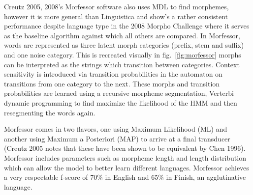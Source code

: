 \documentclass[runningheads,a4paper]{llncs}
\begin{document}
Creutz 2005, 2008's Morfessor software also uses MDL to find morphemes, however it is more general than Linguistica and show's a rather consistent performance despite language type in the 2008 Morpho Challenge where it serves as the baseline algorithm against which all others are compared. In Morfessor, words are represented as three latent morph categories (prefix, stem and suffix) and one noise category. This is recreated visually in fig.~\ref{fig:morfessor} morphs can be interpreted as the strings which transition between categories. Context sensitivity is introduced via transition probabilities in the automaton on transitions from one category to the next. These morphs and transition probabilities are learned using a recursive morpheme segmentation, Verterbi dynamic programming to find maximize the likelihood of the HMM and then resegmenting the words again. 

Morfessor comes in two flavors, one using Maximum Likelihood (ML)  and another using Maximum a Posteriori (MAP) to arrive at a final transducer (Creutz 2005 notes that these have been shown to be equivalent by Chen 1996). Morfessor includes parameters such as morpheme length and length distribution which can allow the model to better learn different languages. Morfessor achieves a very respectable f-score of 70\% in English and 65\% in Finish, an agglutinative language. 
\end{document}
